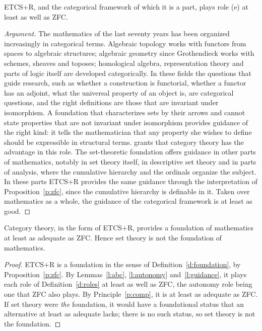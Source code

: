 \documentclass{situationist-preprint}
\begin{document}
\begin{lemma}\label{l:guidance}
ETCS$+$R, and the categorical framework of which it is a part, plays role (e) at least as well as ZFC.
\end{lemma}

\begin{proof}[Argument]
The mathematics of the last seventy years has been organized increasingly in categorical terms. Algebraic topology works with functors from spaces to algebraic structures; algebraic geometry since Grothendieck works with schemes, sheaves and toposes; homological algebra, representation theory and parts of logic itself are developed categorically. In these fields the questions that guide research, such as whether a construction is functorial, whether a functor has an adjoint, what the universal property of an object is, are categorical questions, and the right definitions are those that are invariant under isomorphism. A foundation that characterizes sets by their arrows and cannot state properties that are not invariant under isomorphism provides guidance of the right kind: it tells the mathematician that any property she wishes to define should be expressible in structural terms. \citet{Maddy2017} grants that category theory has the advantage in this role. The set-theoretic foundation offers guidance in other parts of mathematics, notably in set theory itself, in descriptive set theory and in parts of analysis, where the cumulative hierarchy and the ordinals organize the subject. In these parts ETCS$+$R provides the same guidance through the interpretation of Proposition~\ref{p:zfc}, since the cumulative hierarchy is definable in it. Taken over mathematics as a whole, the guidance of the categorical framework is at least as good.
\end{proof}

\begin{theorem}\label{t:main}
Category theory, in the form of ETCS$+$R, provides a foundation of mathematics at least as adequate as ZFC. Hence set theory is not the foundation of mathematics.
\end{theorem}

\begin{proof}
ETCS$+$R is a foundation in the sense of Definition~\ref{d:foundation}, by Proposition~\ref{p:zfc}. By Lemmas~\ref{l:abc}, \ref{l:autonomy} and~\ref{l:guidance}, it plays each role of Definition~\ref{d:roles} at least as well as ZFC, the autonomy role being one that ZFC also plays. By Principle~\ref{p:comp}, it is at least as adequate as ZFC. If set theory were \emph{the} foundation, it would have a foundational status that an alternative at least as adequate lacks; there is no such status, so set theory is not the foundation.
\end{proof}
\end{document}
